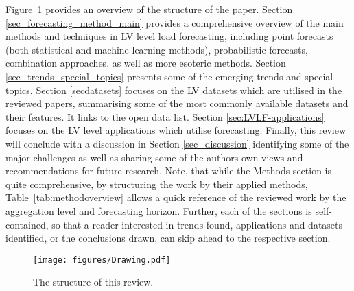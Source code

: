 Figure~\ref{fig:flowchart} provides an overview of the structure of the paper. 
Section \ref{sec_forecasting_method_main} provides a comprehensive overview of the main methods and techniques in LV level load forecasting, including point forecasts (both statistical and machine learning methods), probabilistic forecasts, combination approaches, as well as more esoteric methods. Section \ref{sec_trends_special_topics} presents some of the emerging trends and special topics. Section \ref{secdatasets} focuses on the LV datasets which are utilised in the reviewed papers, summarising some of the most commonly available datasets and their features. It links to the open data list. Section \ref{sec:LVLF-applications} focuses on the LV level applications which utilise forecasting. Finally, this review will conclude with a discussion in Section \ref{sec_discussion} identifying some of the major challenges as well as sharing some of the authors own views and recommendations for future research. Note, that while the Methods section is quite comprehensive, by structuring the work by their applied methods, Table~\ref{tab:methodoverview} allows a quick reference of the reviewed work by the aggregation level and forecasting horizon. Further, each of the sections is self-contained, so that a reader interested in trends found, applications and datasets identified, or the conclusions drawn, can skip ahead to the respective section.

\begin{figure}
	\centering
	\texttt{[image: figures/Drawing.pdf]}
	\caption{The structure of this review.}
	\label{fig:flowchart}
\end{figure}
